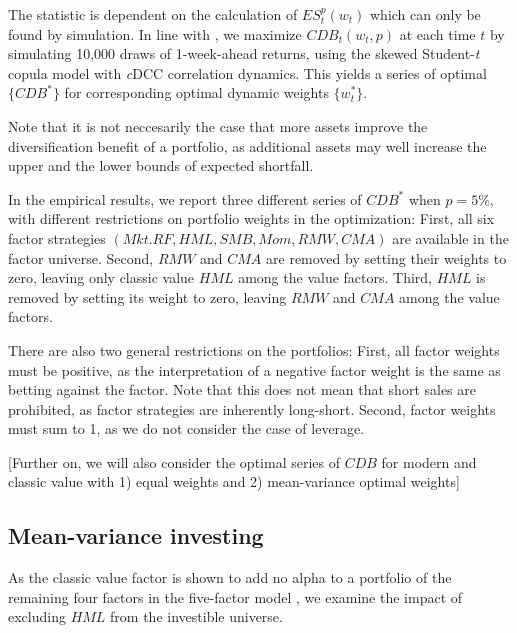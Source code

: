 The statistic is dependent on the calculation of $ES^p_t(w_t)$ which can only be found by simulation. In line with \textcite{ChristoffersenErrunzaJacobLanglois2012}, we maximize $CDB_t(w_t,p)$ at each time $t$ by simulating 10,000 draws of 1-week-ahead returns, using the skewed Student-\textit{t} copula model with \textit{c}DCC correlation dynamics. This yields a series of optimal $\{CDB^*\}$ for corresponding optimal dynamic weights $\{w^*_t\}$.

Note that it is not neccesarily the case that more assets improve the diversification benefit of a portfolio, as additional assets may well increase the upper and the lower bounds of expected shortfall.

In the empirical results, we report three different series of $CDB^*$ when $p=5\%$, with different restrictions on portfolio weights in the optimization: First, all six factor strategies $(Mkt.RF, HML, SMB, Mom, RMW, CMA)$ are available in the factor universe. Second, $RMW$ and $CMA$ are removed by setting their weights to zero, leaving only classic value $HML$ among the value factors. Third, $HML$ is removed by setting its weight to zero, leaving $RMW$ and $CMA$ among the value factors.

There are also two general restrictions on the portfolios: First, all factor weights must be positive, as the interpretation of a negative factor weight is the same as betting against the factor. Note that this does not mean that short sales are prohibited, as factor strategies are inherently long-short. Second, factor weights must sum to 1, as we do not consider the case of leverage.

[Further on, we will also consider the optimal series of $CDB$ for modern and classic value with 1) equal weights and 2) mean-variance optimal weights]

\subsection{Mean-variance investing}
As the classic value factor is shown to add no alpha to a portfolio of the remaining four factors in the five-factor model \autocite{FF2015}, we examine the impact of excluding $HML$ from the investible universe.

